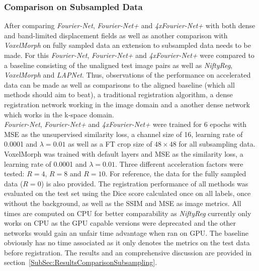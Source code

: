 \documentclass[english,version-2022-01]{uzl-thesis} %
\begin{document}
\subsubsection{Comparison on Subsampled Data} \label{SubSubSec:ComparisonSubsampling}
After comparing \emph{Fourier-Net}, \emph{Fourier-Net+} and \emph{4xFourier-Net+} with both dense and band-limited displacement fields as well as another comparison with \emph{VoxelMorph} on fully sampled data 
an extension to subsampled data needs to be made. For this \emph{Fourier-Net}, \emph{Fourier-Net+} and \emph{4xFourier-Net+} were compared to a baseline consisting of the unaligned test image pairs as well as \emph{NiftyReg}, \emph{VoxelMorph} and \emph{LAPNet}. Thus, observations of the performance on accelerated data can be made as well as comparisons to the aligned baseline (which all methods should aim to beat), a traditional registration algorithm, a dense registration network working in the image domain and a another dense network which works in the k-space domain.\\
\emph{Fourier-Net}, \emph{Fourier-Net+} and \emph{4xFourier-Net+} were trained for 6 epochs with MSE as the unsupervised similarity loss, a channel size of 16, learning rate of 0.0001 and $\lambda=0.01$ as well as a FT crop size of $48 \times 48$ for all subsampling data. VoxelMorph was trained with default layers and MSE as the similarity loss, a learning rate of 0.0001 and $\lambda=0.01$. Three different acceleration factors were tested: $R=4$, $R=8$ and $R=10$. For reference, the data for the fully sampled data ($R=0$) is also provided. The registration performance of all methods was evaluated on the test set using the Dice score calculated once on all labels, once without the background, as well as the SSIM and MSE as image metrics. All times are computed on CPU for better comparability as \emph{NiftyReg} currently only works on CPU as the GPU capable versions were deprecated and the other networks would gain an unfair time advantage when ran on GPU. The baseline obviously has no time associated as it only denotes the metrics on the test data before registration. The results and an comprehensive discussion are provided in section~\ref{SubSec:ResultsComparisonSubsampling}.
\end{document}
